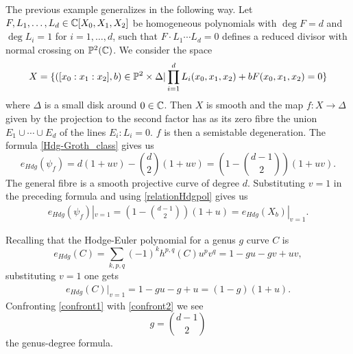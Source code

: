\documentclass[../main.tex]{subfiles}
\begin{document}
\begin{es}
    The previous example generalizes in the following way.
    Let $F,L_1, \dots, L_d \in \mathbb{C}[X_0,X_1,X_2] $ be homogeneous polynomials with $\deg F = d$ and $\deg L_i=1$ for $i=1, \dots,d$, such that $F \cdot L_1 \cdots L_d =0$ defines a reduced divisor with normal crossing on $\mathbb{P}^2(\mathbb{C})$.
    We consider the space
    \[
    X = \{ ([x_0:x_1:x_2] , b ) \in \mathbb{P}^2 \times \Delta | \prod_{i=1}^d L_i(x_0,x_1,x_2) + b F( x_0,x_1,x_2)=0 \}
    \]
    where $\Delta$ is a small disk around $0 \in \mathbb{C}$. Then $X$ is smooth and the map $f \colon X \to \Delta$ given by the projection to the second factor has as its zero fibre the union $E_1 \cup \cdots \cup E_d$ of the lines $E_i : L_i=0$. $f$ is then a semistable degeneration.
    The formula \ref{Hdg-Groth_class} gives us 
    \[
    e_{Hdg}(\psi_f) = d(1+uv) -  {d\choose 2}(1 + uv) = (1- {d-1\choose 2})(1+uv).
    \]
    The general fibre is a smooth projective curve of degree $d$. Substituting $v=1$ in the preceding formula and using \eqref{relationHdgpol} gives us
    \begin{align} \label{confront1}
     e_{Hdg}(\psi_f)|_{v=1} = (1- {d-1\choose 2})(1+u) = e_{Hdg}(X_b)|_{v=1}.
    \end{align}
    
    Recalling that the Hodge-Euler polynomial for a genus $g$ curve $C$ is 
    \[
    e_{Hdg}(C) = \sum_{k,p,q} (-1)^k h^{p,q}(C) u^pv^q = 1 -gu-gv +uv,
    \]
     substituting $v=1$ one gets
    \begin{align} \label{confront2}
    e_{Hdg}(C)|_{v=1} = 1 -gu-g +u = (1-g)(1+u).
    \end{align}
    Confronting \eqref{confront1} with \eqref{confront2} we see 
    \[
    g = {d-1\choose 2}
    \]
    the genus-degree formula.
\end{es}
\end{document}
